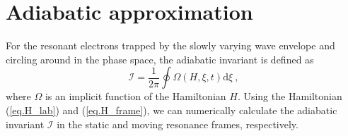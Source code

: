 \section{Adiabatic approximation}
\label{sec:dis}
For the resonant electrons trapped by the slowly varying wave envelope and circling around in the phase space,  the adiabatic invariant is defined as
\begin{equation}\label{eq.def_I}
    \mathcal{I} = \frac{1}{2\pi} \oint \Omega(H,\xi,t) \mathrm{d} \xi~,
\end{equation}
where $\Omega$ is an implicit function of the Hamiltonian $H$.
Using the Hamiltonian (\ref{eq.H_lab}) and (\ref{eq.H_frame}), 
we can numerically calculate the adiabatic invariant $\mathcal{I}$  in the static and moving resonance frames, respectively.


